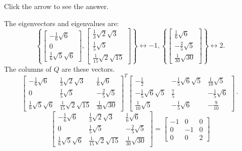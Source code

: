 \documentclass{ximera}
\begin{document}
\begin{problem}
\begin{hint}
Click the arrow to see the answer. \begin{expandable}
The eigenvectors and eigenvalues are:
\[
\left\{ \left[
\begin{array}{c}
-\frac{1}{6}\sqrt{6} \\
0 \\
\frac{1}{6}\sqrt{5}\sqrt{6}
\end{array}
\right] ,\left[
\begin{array}{c}
\frac{1}{3}\sqrt{2}\sqrt{3} \\
\frac{1}{5}\sqrt{5} \\
\frac{1}{15}\sqrt{2}\sqrt{15}
\end{array}
\right] \right\} \leftrightarrow -1,\left\{ \left[
\begin{array}{c}
\frac{1}{6}\sqrt{6} \\
-\frac{2}{5}\sqrt{5} \\
\frac{1}{30}\sqrt{30}
\end{array}
\right] \right\} \leftrightarrow 2 .
\]
The columns of $Q$ are these vectors.
\[
\left[
\begin{array}{ccc}
-\frac{1}{6}\sqrt{6} & \frac{1}{3}\sqrt{2}\sqrt{3} & \frac{1}{6}\sqrt{6} \\
0 & \frac{1}{5}\sqrt{5} & -\frac{2}{5}\sqrt{5} \\
\frac{1}{6}\sqrt{5}\sqrt{6} & \frac{1}{15}\sqrt{2}\sqrt{15} & \frac{1}{30}
\sqrt{30}
\end{array}
\right] ^{T}\left[
\begin{array}{ccc}
- \frac{1}{2} & - \frac{1}{5}\sqrt{6}\sqrt{5} &
 \frac{1}{10}\sqrt{5} \\
- \frac{1}{5}\sqrt{6}\sqrt{5} &  \frac{7}{5} & -
 \frac{1}{5}\sqrt{6} \\
 \frac{1}{10}\sqrt{5} & - \frac{1}{5}\sqrt{6} & -
 \frac{9}{10}
\end{array}
\right] \cdot
\]
\[
\left[
\begin{array}{ccc}
-\frac{1}{6}\sqrt{6} & \frac{1}{3}\sqrt{2}\sqrt{3} & \frac{1}{6}\sqrt{6} \\
0 & \frac{1}{5}\sqrt{5} & -\frac{2}{5}\sqrt{5} \\
\frac{1}{6}\sqrt{5}\sqrt{6} & \frac{1}{15}\sqrt{2}\sqrt{15} & \frac{1}{30}
\sqrt{30}
\end{array}
\right] =\left[
\begin{array}{rrr}
-1 & 0 & 0 \\
0 & -1 & 0 \\
0 & 0 & 2
\end{array}
\right]
\]
\end{expandable} \end{hint}
\end{problem}
\end{document}
